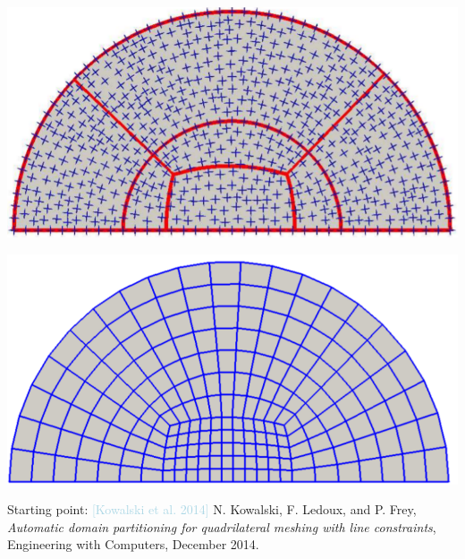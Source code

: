 \documentclass[a0paper,portrait, fontscale=0.30]{baposter}
\begin{document}
\begin{poster}
{\begin{minipage}[b]{0.23\linewidth}
\includegraphics[width=0.99\linewidth]{3}
\label{fig:figure3}
\end{minipage}
\begin{minipage}[b]{0.23\linewidth}
\includegraphics[width=0.99\linewidth]{4}
\label{fig:figure4}
\end{minipage}
\begin{minipage}[b]{1.0\linewidth}
Starting point: \footnotesize \textcolor{lightblue}{[Kowalski et al. 2014]} N. Kowalski, F. Ledoux, and P. Frey, \textit{Automatic domain partitioning for quadrilateral meshing with line constraints}, Engineering with Computers, December 2014.
\end{minipage}
\vspace{-0.5cm}
}
\end{poster}
\end{document}
